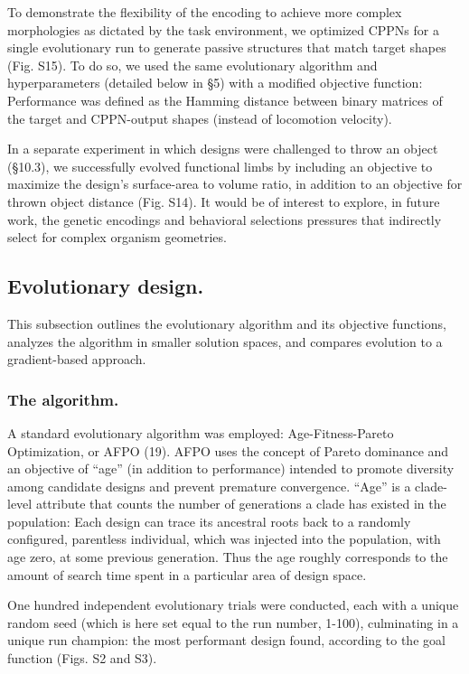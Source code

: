 To demonstrate the flexibility of the encoding to achieve more complex morphologies as dictated by the task environment, we optimized CPPNs for a single evolutionary run to generate passive structures that match target shapes (Fig. S15). To do so, we used the same evolutionary algorithm and hyperparameters (detailed below in §5) with a modified objective function: Performance was defined as the Hamming distance between binary matrices of the target and CPPN-output shapes (instead of locomotion velocity). 

In a separate experiment in which designs were challenged to throw an object (§10.3), we successfully evolved functional limbs by including an objective to maximize the design's surface-area to volume ratio, in addition to an objective for thrown object distance (Fig. S14). It would be of interest to explore, in future work, the genetic encodings and behavioral selections pressures that indirectly select for complex organism geometries.


\subsection*{Evolutionary design.}

This subsection outlines the evolutionary algorithm and its objective functions, analyzes the algorithm in smaller solution spaces, and compares evolution to a gradient-based approach.

\subsubsection*{The algorithm.}  

A standard evolutionary algorithm was employed: Age-Fitness-Pareto Optimization, or AFPO (19). AFPO uses the concept of Pareto dominance and an objective of ``age'' (in addition to performance) intended to promote diversity among candidate designs and prevent premature convergence. ``Age'' is a clade-level attribute that counts the number of generations a clade has existed in the population: Each design can trace its ancestral roots back to a randomly configured, parentless individual, which was injected into the population, with age zero, at some previous generation. Thus the age roughly corresponds to the amount of search time spent in a particular area of design space.

One hundred independent evolutionary trials were conducted, each with a unique random seed (which is here set equal to the run number, 1-100), culminating in a unique run champion: the most performant design found, according to the goal function (Figs. S2 and S3).

